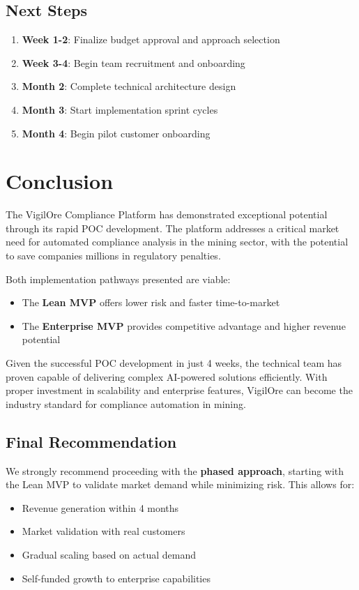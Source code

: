 \documentclass[12pt,a4paper]{report}
\begin{document}
\section{Next Steps}

\begin{enumerate}
    \item \textbf{Week 1-2}: Finalize budget approval and approach selection
    \item \textbf{Week 3-4}: Begin team recruitment and onboarding
    \item \textbf{Month 2}: Complete technical architecture design
    \item \textbf{Month 3}: Start implementation sprint cycles
    \item \textbf{Month 4}: Begin pilot customer onboarding
\end{enumerate}

\chapter{Conclusion}

The VigilOre Compliance Platform has demonstrated exceptional potential through its rapid POC development. The platform addresses a critical market need for automated compliance analysis in the mining sector, with the potential to save companies millions in regulatory penalties.

Both implementation pathways presented are viable:
\begin{itemize}
    \item The \textbf{Lean MVP} offers lower risk and faster time-to-market
    \item The \textbf{Enterprise MVP} provides competitive advantage and higher revenue potential
\end{itemize}

Given the successful POC development in just 4 weeks, the technical team has proven capable of delivering complex AI-powered solutions efficiently. With proper investment in scalability and enterprise features, VigilOre can become the industry standard for compliance automation in mining.

\section{Final Recommendation}

We strongly recommend proceeding with the \textbf{phased approach}, starting with the Lean MVP to validate market demand while minimizing risk. This allows for:
\begin{itemize}
    \item Revenue generation within 4 months
    \item Market validation with real customers
    \item Gradual scaling based on actual demand
    \item Self-funded growth to enterprise capabilities
\end{itemize}
\end{document}
